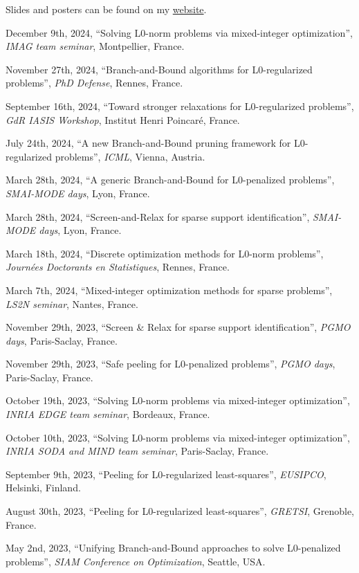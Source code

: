 Slides and posters can be found on my \href{https://theoguyard.github.io/talks}{website}.

\begin{etaremune}
    \item December 9th, 2024, ``Solving L0-norm problems via mixed-integer optimization'', \textit{IMAG team seminar}, Montpellier, France.
    \item November 27th, 2024, ``Branch-and-Bound algorithms for L0-regularized problems'', \textit{PhD Defense}, Rennes, France.
    \item September 16th, 2024, ``Toward stronger relaxations for L0-regularized problems'', \textit{GdR IASIS Workshop}, Institut Henri Poincaré, France.
    \item July 24th, 2024, ``A new Branch-and-Bound pruning framework for L0-regularized problems'', \textit{ICML}, Vienna, Austria.
    \item March 28th, 2024, ``A generic Branch-and-Bound for L0-penalized problems'', \textit{SMAI-MODE days}, Lyon, France.
    \item March 28th, 2024, ``Screen-and-Relax for sparse support identification'', \textit{SMAI-MODE days}, Lyon, France.
    \item March 18th, 2024, ``Discrete optimization methods for L0-norm problems'', \textit{Journées Doctorants en Statistiques}, Rennes, France.
    \item March 7th, 2024, ``Mixed-integer optimization methods for sparse problems'', \textit{LS2N seminar}, Nantes, France.
    \item November 29th, 2023, ``Screen \& Relax for sparse support identification'', \textit{PGMO days}, Paris-Saclay, France.
    \item November 29th, 2023, ``Safe peeling for L0-penalized problems'', \textit{PGMO days}, Paris-Saclay, France.
    \item October 19th, 2023, ``Solving L0-norm problems via mixed-integer optimization'', \textit{INRIA EDGE team seminar}, Bordeaux, France.
    \item October 10th, 2023, ``Solving L0-norm problems via mixed-integer optimization'', \textit{INRIA SODA and MIND team seminar}, Paris-Saclay, France.
    \item September 9th, 2023, ``Peeling for L0-regularized least-squares'', \textit{EUSIPCO}, Helsinki, Finland.
    \item August 30th, 2023, ``Peeling for L0-regularized least-squares'', \textit{GRETSI}, Grenoble, France.
    \item May 2nd, 2023, ``Unifying Branch-and-Bound approaches to solve L0-penalized problems'', \textit{SIAM Conference on Optimization}, Seattle, USA.

\end{etaremune}
